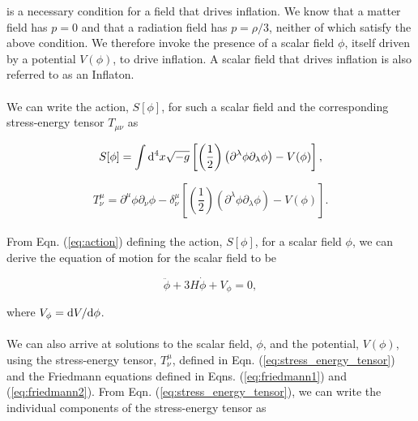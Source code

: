 \documentclass[12pt,a4paper,oneside]{book}
\begin{document}
\noindent is a necessary condition for a field that drives inflation. We know that a matter 
field has $p=0$ and that a radiation field has $p=\rho/3$, neither of which 
satisfy the above condition. We therefore invoke the presence of a scalar field $\phi$, 
itself driven by a potential $V(\phi)$, to drive inflation. A scalar field that drives 
inflation is also referred to as an Inflaton.

\paragraph*{} We can write the action, $S[\phi]$, for such a scalar field 
and the corresponding stress-energy tensor $T_{\mu\nu}$ as

\begin{equation}\label{eq:action}
S[\phi] = \int {\rm d}^4x \sqrt{-g}\left[ \left(\frac{1}{2}\right)
\left(\partial^{\lambda}\phi \partial_{\lambda}\phi\right) - V(\phi)\right],
\end{equation}

\begin{equation}\label{eq:stress_energy_tensor}
T^{\mu}_{\nu} = \partial^{\mu}\phi \partial_{\nu}\phi 
-\delta^{\mu}_{\nu}\left[\left(\frac{1}{2}\right)
\left(\partial^{\lambda}\phi \partial_{\lambda}\phi\right) - V(\phi)\right].
\end{equation}

\paragraph*{} From Eqn. (\ref{eq:action}) defining the action, $S[\phi]$, for a scalar 
field $\phi$, we can derive the equation of motion for the scalar field to be

\begin{equation}\label{eq:phi_ODE}
\ddot{\phi} + 3H\dot{\phi} + V_{\phi} = 0,
\end{equation}

\noindent where $V_{\phi} = {\rm d}V/{\rm d}\phi$.

\paragraph*{} We can also arrive at solutions to the scalar field, $\phi$, and the 
potential, $V(\phi)$, using the stress-energy tensor, $T^{\mu}_{\nu}$, 
defined in Eqn. (\ref{eq:stress_energy_tensor}) 
and the Friedmann equations defined in Eqns. (\ref{eq:friedmann1}) and (\ref{eq:friedmann2}). 
From Eqn. (\ref{eq:stress_energy_tensor}), we can 
write the individual components of the stress-energy tensor as 
\end{document}
